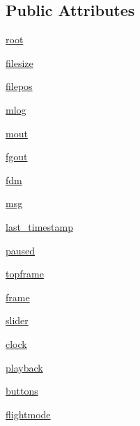 \subsection*{Public Attributes}
\begin{DoxyCompactItemize}
\item 
\mbox{\hyperlink{classpymavlink_1_1tools_1_1mavplayback_1_1App_a129c43f2e139a19b860dd75ec9580ec5}{root}}
\item 
\mbox{\hyperlink{classpymavlink_1_1tools_1_1mavplayback_1_1App_aa980cdd38482349a953775c6a7c41bb4}{filesize}}
\item 
\mbox{\hyperlink{classpymavlink_1_1tools_1_1mavplayback_1_1App_a21895e2dd390eccacf1f5aa85bd6743a}{filepos}}
\item 
\mbox{\hyperlink{classpymavlink_1_1tools_1_1mavplayback_1_1App_ad76f8051ecfd686de08695174f110410}{mlog}}
\item 
\mbox{\hyperlink{classpymavlink_1_1tools_1_1mavplayback_1_1App_a2cbc78038ce15eead86a18fc8911569b}{mout}}
\item 
\mbox{\hyperlink{classpymavlink_1_1tools_1_1mavplayback_1_1App_a699e6d4a82992e03820539b9bb98cf1c}{fgout}}
\item 
\mbox{\hyperlink{classpymavlink_1_1tools_1_1mavplayback_1_1App_ac8e924f5d7299ed806ffb51fe9dfdcd6}{fdm}}
\item 
\mbox{\hyperlink{classpymavlink_1_1tools_1_1mavplayback_1_1App_a747e1fb77c5e22e2997a140c3ed64295}{msg}}
\item 
\mbox{\hyperlink{classpymavlink_1_1tools_1_1mavplayback_1_1App_a542340471b867c7533d57fd1d5180c7b}{last\+\_\+timestamp}}
\item 
\mbox{\hyperlink{classpymavlink_1_1tools_1_1mavplayback_1_1App_a96d29e3c976c774c8d7ce47d7b663c18}{paused}}
\item 
\mbox{\hyperlink{classpymavlink_1_1tools_1_1mavplayback_1_1App_a25095848f0fc353d1136d6d835991c4c}{topframe}}
\item 
\mbox{\hyperlink{classpymavlink_1_1tools_1_1mavplayback_1_1App_a5a7632b015718e2ae1af7531483f754a}{frame}}
\item 
\mbox{\hyperlink{classpymavlink_1_1tools_1_1mavplayback_1_1App_aa21d502ecd3c05b4e656b7ead5effe9d}{slider}}
\item 
\mbox{\hyperlink{classpymavlink_1_1tools_1_1mavplayback_1_1App_a78cf72f67fe480c307c06d926d1ab32e}{clock}}
\item 
\mbox{\hyperlink{classpymavlink_1_1tools_1_1mavplayback_1_1App_a13ee85fc339f1cbc34bd9064f597b6fb}{playback}}
\item 
\mbox{\hyperlink{classpymavlink_1_1tools_1_1mavplayback_1_1App_ac89c68f9a4e472d0ff5f640271db6dc2}{buttons}}
\item 
\mbox{\hyperlink{classpymavlink_1_1tools_1_1mavplayback_1_1App_aed54fe3fd01027fb1d535e65ec40be04}{flightmode}}
\end{DoxyCompactItemize}


